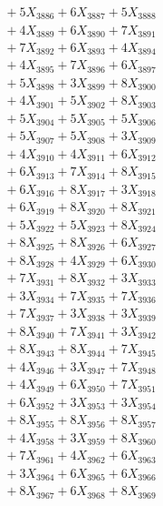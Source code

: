 \documentclass[a4paper,10pt]{article}
\begin{document}
{\begin{align}
&\;  + 5 X_{3886} + 6 X_{3887} + 5 X_{3888} \\[0.3ex]
&\;  + 4 X_{3889} + 6 X_{3890} + 7 X_{3891} \\[0.3ex]
&\;  + 7 X_{3892} + 6 X_{3893} + 4 X_{3894} \\[0.3ex]
&\;  + 4 X_{3895} + 7 X_{3896} + 6 X_{3897} \\[0.3ex]
&\;  + 5 X_{3898} + 3 X_{3899} + 8 X_{3900} \\[0.3ex]
&\;  + 4 X_{3901} + 5 X_{3902} + 8 X_{3903} \\[0.3ex]
&\;  + 5 X_{3904} + 5 X_{3905} + 5 X_{3906} \\[0.3ex]
&\;  + 5 X_{3907} + 5 X_{3908} + 3 X_{3909} \\[0.5ex]\allowbreak
&\;  + 4 X_{3910} + 4 X_{3911} + 6 X_{3912} \\[0.3ex]
&\;  + 6 X_{3913} + 7 X_{3914} + 8 X_{3915} \\[0.3ex]
&\;  + 6 X_{3916} + 8 X_{3917} + 3 X_{3918} \\[0.3ex]
&\;  + 6 X_{3919} + 8 X_{3920} + 8 X_{3921} \\[0.3ex]
&\;  + 5 X_{3922} + 5 X_{3923} + 8 X_{3924} \\[0.3ex]
&\;  + 8 X_{3925} + 8 X_{3926} + 6 X_{3927} \\[0.3ex]
&\;  + 8 X_{3928} + 4 X_{3929} + 6 X_{3930} \\[0.3ex]
&\;  + 7 X_{3931} + 8 X_{3932} + 3 X_{3933} \\[0.3ex]
&\;  + 3 X_{3934} + 7 X_{3935} + 7 X_{3936} \\[0.3ex]
&\;  + 7 X_{3937} + 3 X_{3938} + 3 X_{3939} \\[0.5ex]\allowbreak
&\;  + 8 X_{3940} + 7 X_{3941} + 3 X_{3942} \\[0.3ex]
&\;  + 8 X_{3943} + 8 X_{3944} + 7 X_{3945} \\[0.3ex]
&\;  + 4 X_{3946} + 3 X_{3947} + 7 X_{3948} \\[0.3ex]
&\;  + 4 X_{3949} + 6 X_{3950} + 7 X_{3951} \\[0.3ex]
&\;  + 6 X_{3952} + 3 X_{3953} + 3 X_{3954} \\[0.3ex]
&\;  + 8 X_{3955} + 8 X_{3956} + 8 X_{3957} \\[0.3ex]
&\;  + 4 X_{3958} + 3 X_{3959} + 8 X_{3960} \\[0.3ex]
&\;  + 7 X_{3961} + 4 X_{3962} + 6 X_{3963} \\[0.3ex]
&\;  + 3 X_{3964} + 6 X_{3965} + 6 X_{3966} \\[0.3ex]
&\;  + 8 X_{3967} + 6 X_{3968} + 8 X_{3969} \\[0.5ex]\allowbreak

\end{align}}
\end{document}
